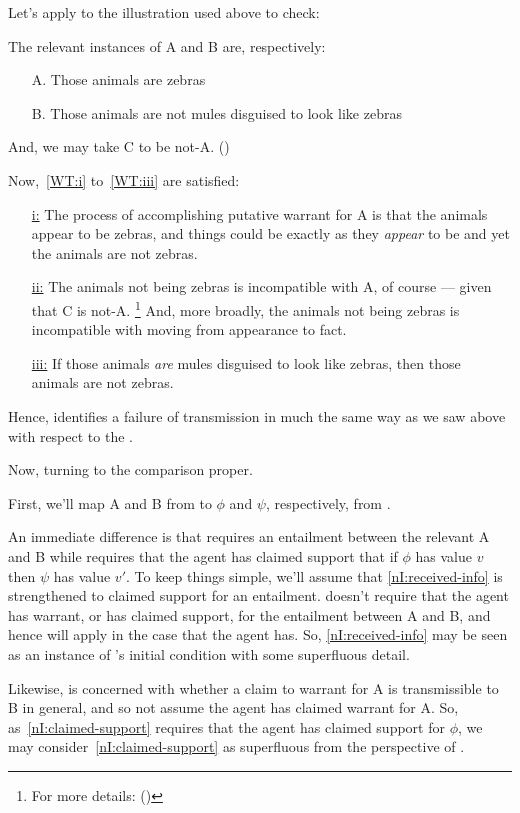 \begin{note}
  Let's apply \wrt{} to the illustration used above to check:

  The relevant instances of A and B are, respectively:
  \begin{itemize}
  \item[A.] Those animals are zebras
  \item[B.] Those animals are not mules disguised to look like zebras
  \end{itemize}
  And, we may take C to be not-A. (\Citeyear[90]{Wright:2011wn})

  Now,~\ref{WT:i} to~\ref{WT:iii} are satisfied:

  \begin{itemize}
  \item[{\hyperref[WT:i]{i:}}] The process of accomplishing putative warrant for A is that the animals appear to be zebras, and things could be exactly as they \emph{appear} to be and yet the animals are not zebras.
  \item[{\hyperref[WT:ii]{ii:}}] The animals not being zebras is incompatible with A, of course --- given that C is not-A.\nolinebreak
    \footnote{
      For more details: (\Citeyear[90--96]{Wright:2011wn})
    }
    And, more broadly, the animals not being zebras is incompatible with moving from appearance to fact.
  \item[{\hyperref[WT:iii]{iii:}}] If those animals \emph{are} mules disguised to look like zebras, then those animals are not zebras.
  \end{itemize}
  Hence, \wrt{} identifies a failure of transmission in much the same way as we saw above with respect to the \widt{}.
\end{note}

\begin{note}[Entailment]
  Now, turning to the comparison proper.

  First, we'll map A and B from \wrt{} to \(\phi\) and \(\psi\), respectively, from \nI{}.

  An immediate difference is that \wrt{} requires an entailment between the relevant A and B while \nI{} requires that the agent has claimed support that if \(\phi\) has value \(v\) then \(\psi\) has value \(v'\).
  To keep things simple, we'll assume that \ref{nI:received-info} is strengthened to claimed support for an entailment.
  \wrt{} doesn't require that the agent has warrant, or has claimed support, for the entailment between A and B, and hence will apply in the case that the agent has.
    So, \ref{nI:received-info} may be seen as an instance of \wrt{}'s initial condition with some superfluous detail.

  Likewise, \wrt{} is concerned with whether a claim to warrant for A is transmissible to B in general, and so not assume the agent has claimed warrant for A.
  So, as~\ref{nI:claimed-support} requires that the agent has claimed support for \(\phi\), we may consider~\ref{nI:claimed-support} as superfluous from the perspective of \wrt{}.
\end{note}

